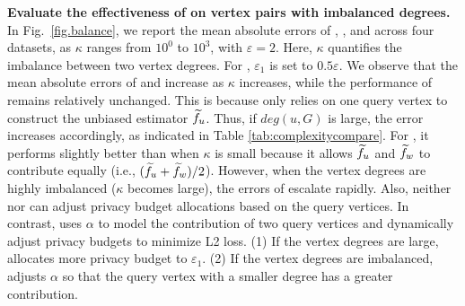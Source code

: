 \noindent
\textbf{Evaluate the effectiveness of \advds on vertex pairs with imbalanced degrees.} 
In Fig.~\ref{fig.balance}, we report the mean absolute errors of \advss, \advdsbasic, and \advds across four datasets, as $\kappa$ ranges from $10^0$ to $10^3$, with $\varepsilon = 2$. 
Here, $\kappa$ quantifies the imbalance between two vertex degrees. 
For \advdsbasic, $\varepsilon_1$ is set to $0.5 \varepsilon$. 
We observe that the mean absolute errors of \advss and \advdsbasic increase as $\kappa$ increases, while the performance of \advds remains relatively unchanged. 
This is because \advss only relies on one query vertex to construct the unbiased estimator $\widetilde{f}_u$. 
Thus, if $deg(u,G)$ is large, the error increases accordingly, as indicated in Table \ref{tab:complexitycompare}. 
For \advdsbasic, it performs slightly better than \advss when $\kappa$ is small because it allows $\widetilde{f}_u$ and $\widetilde{f}_w$ to contribute equally (i.e., $(\widetilde{f}_u + \widetilde{f}_w)/2$). 
However, when the vertex degrees are highly imbalanced ($\kappa$ becomes large), the errors of \advdsbasic escalate rapidly. 
Also, neither \advss nor \advdsbasic can adjust privacy budget allocations based on the query vertices. 
In contrast, \advds uses $\alpha$ to model the contribution of two query vertices and dynamically adjust privacy budgets to minimize L2 loss. 
(1) If the vertex degrees are large, \advds allocates more privacy budget to $\varepsilon_1$. 
(2) If the vertex degrees are imbalanced, \advds adjusts $\alpha$ so that the query vertex with a smaller degree has a greater contribution. 


